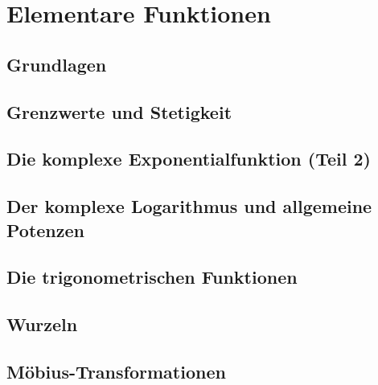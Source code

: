 \section{Elementare Funktionen}

\subsection{Grundlagen}

\subsection{Grenzwerte und Stetigkeit}

\subsection{Die komplexe Exponentialfunktion (Teil 2)}

\subsection{Der komplexe Logarithmus und allgemeine Potenzen}

\subsection{Die trigonometrischen Funktionen}

\subsection{Wurzeln}

\subsection{Möbius-Transformationen}
